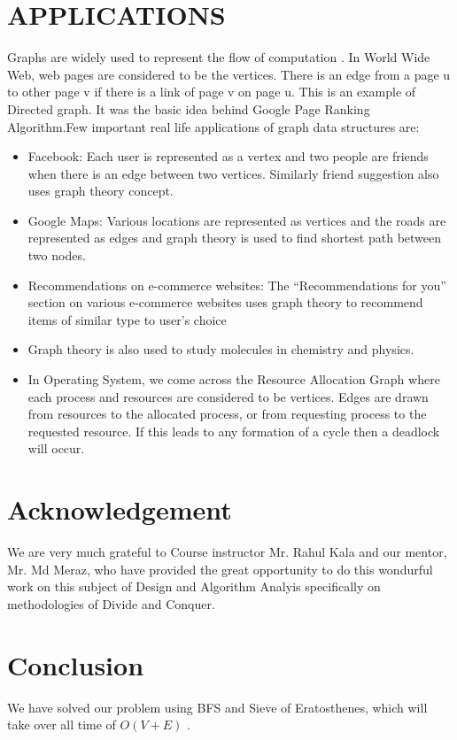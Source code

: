 \documentclass[conference]{IEEEtran}
\begin{document}
\section{APPLICATIONS}
Graphs are widely used to represent the flow of computation .
In World Wide Web, web pages are considered to be the vertices. There is an edge from a page u to other page v if there is a link of page v on page u. This is an example of Directed graph. It was the basic idea behind Google Page Ranking Algorithm.Few important real life applications of graph data structures are:

\begin{itemize}
    \item Facebook: Each user is represented as a vertex and two people are friends when there is an edge between two vertices. Similarly friend suggestion also uses graph theory concept.
     \item Google Maps: Various locations are represented as vertices and the roads are represented as edges and graph theory is used to find shortest path between two nodes.
\item Recommendations on e-commerce websites: The “Recommendations for you” section on various e-commerce websites uses graph theory to recommend items of similar type to user’s choice
\item Graph theory is also used to study molecules in chemistry and physics.
\item In Operating System, we come across the Resource Allocation Graph where each process and resources are considered to be vertices. Edges are drawn from resources to the allocated process, or from requesting process to the requested resource. If this leads to any formation of a cycle then a deadlock will occur.
\end{itemize}


\section{Acknowledgement}
We are very much grateful to Course instructor Mr. Rahul Kala and our mentor, Mr. Md Meraz, who have provided the great opportunity to do this wondurful work on this subject of Design and Algorithm Analyis specifically on methodologies of Divide and Conquer.

\section{Conclusion}
We have solved our problem using BFS and Sieve of Eratosthenes,
which will take over all time of $O(V+E)$ .
\end{document}
